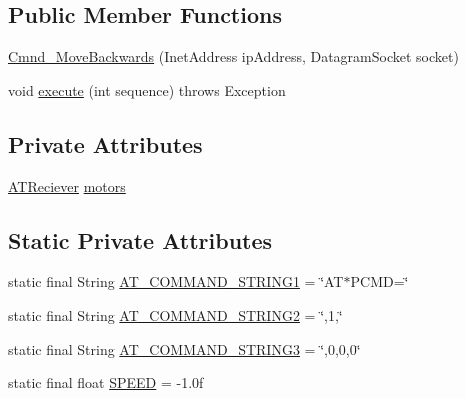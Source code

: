 \subsection*{Public Member Functions}
\begin{DoxyCompactItemize}
\item 
\hyperlink{class_drone_1_1_drone_commands_1_1_cmnd___move_backwards_acd5f813284f037025fde41b3929de115}{Cmnd\+\_\+\+Move\+Backwards} (Inet\+Address ip\+Address, Datagram\+Socket socket)
\item 
void \hyperlink{class_drone_1_1_drone_commands_1_1_cmnd___move_backwards_acb9c081aeee86e681d099057251bf1ba}{execute} (int sequence)  throws Exception  	
\end{DoxyCompactItemize}
\subsection*{Private Attributes}
\begin{DoxyCompactItemize}
\item 
\hyperlink{class_drone_1_1_hardware_1_1_a_t_reciever}{A\+T\+Reciever} \hyperlink{class_drone_1_1_drone_commands_1_1_cmnd___move_backwards_ab2fe68c416f15558165a29a12981fc43}{motors}
\end{DoxyCompactItemize}
\subsection*{Static Private Attributes}
\begin{DoxyCompactItemize}
\item 
static final String \hyperlink{class_drone_1_1_drone_commands_1_1_cmnd___move_backwards_a62a5be094d2de1a91587df098faa685a}{A\+T\+\_\+\+C\+O\+M\+M\+A\+N\+D\+\_\+\+S\+T\+R\+I\+N\+G1} = \char`\"{}A\+T$\ast$P\+C\+M\+D=\char`\"{}
\item 
static final String \hyperlink{class_drone_1_1_drone_commands_1_1_cmnd___move_backwards_a253062f14f3f50f1eae102a97a743876}{A\+T\+\_\+\+C\+O\+M\+M\+A\+N\+D\+\_\+\+S\+T\+R\+I\+N\+G2} = \char`\"{},1,\char`\"{}
\item 
static final String \hyperlink{class_drone_1_1_drone_commands_1_1_cmnd___move_backwards_aadb85a8030191ae34469dd541ab59c4e}{A\+T\+\_\+\+C\+O\+M\+M\+A\+N\+D\+\_\+\+S\+T\+R\+I\+N\+G3} = \char`\"{},0,0,0\char`\"{}
\item 
static final float \hyperlink{class_drone_1_1_drone_commands_1_1_cmnd___move_backwards_ad521b34d56169e808c17bcdbe37e8da9}{S\+P\+E\+E\+D} = -\/1.\+0f
\end{DoxyCompactItemize}


